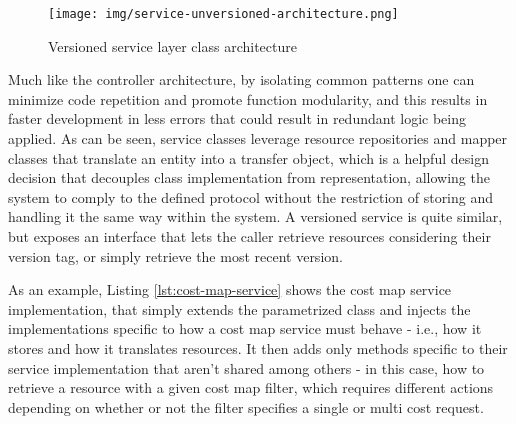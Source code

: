 \begin{figure}[ht]
\centering
\texttt{[image: img/service-unversioned-architecture.png]}
\label{fig:controller-unversioned-architecture}
\caption{Versioned service layer class architecture}
\end{figure}

    Much like the controller architecture, by isolating common patterns one can minimize code repetition and promote function modularity, and this results in faster development in less errors that could result in redundant logic being applied.
    As can be seen, service classes leverage resource repositories and mapper classes that translate an entity into a transfer object, which is a helpful design decision that decouples class implementation from representation, allowing the system to comply to the defined protocol without the restriction of storing and handling it the same way within the system.
    A versioned service is quite similar, but exposes an interface that lets the caller retrieve resources considering their version tag, or simply retrieve the most recent version.

    As an example, Listing \ref{lst:cost-map-service} shows the cost map service implementation, that simply extends the parametrized class and injects the implementations specific to how a cost map service must behave - i.e., how it stores and how it translates resources.
    It then adds only methods specific to their service implementation that aren't shared among others - in this case, how to retrieve a resource with a given cost map filter, which requires different actions depending on whether or not the filter specifies a single or multi cost request.

